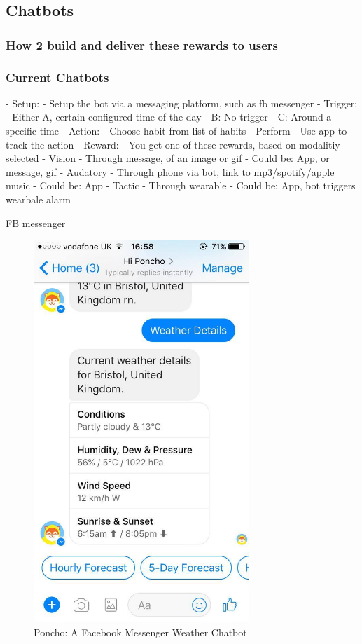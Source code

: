 \subsection{Chatbots}

\subsubsection*{How 2 build and deliver these rewards to users}

\subsubsection*{Current Chatbots}

  - Setup:
    - Setup the bot via a messaging platform, such as fb messenger
  - Trigger:
      - Either A, certain configured time of the day
      -        B: No trigger
      -        C: Around a specific time
  - Action:
    - Choose habit from list of habits
    - Perform
    - Use app to track the action
  - Reward:
    - You get one of these rewards, based on modalitiy selected
    - Vision
      - Through message, of an image or gif
      - Could be: App, or message, gif
    - Audatory
      - Through phone via bot, link to mp3/spotify/apple music
      - Could be: App
    - Tactic
      - Through wearable
      - Could be: App, bot triggers wearbale alarm

FB messenger

\begin{figure}[ht] %
    \centering
    \includegraphics[width=3.2in]{../resources/poncho.jpg}
    \caption{Poncho: A Facebook Messenger Weather Chatbot}
    \label{fig:poncho}
\end{figure}

